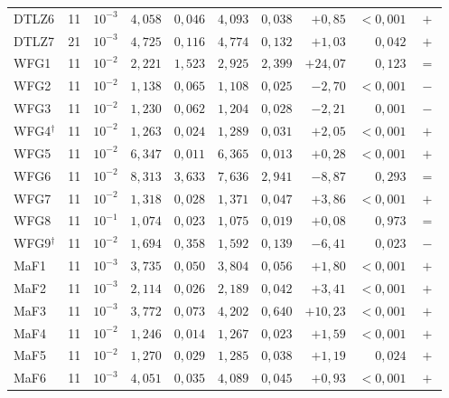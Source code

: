 \begin{table}[!htb]
\begin{tabular*}{\textwidth}{@{\extracolsep{\fill}}lrcrrrrrrc@{}}
        DTLZ6 & 11 & $10^{-3}$ & $4{,}058$ & $0{,}046$ & $4{,}093$ & $0{,}038$ & $+0{,}85$ & $<0{,}001$ & $+$ \\
        DTLZ7 & 21 & $10^{-3}$ & $4{,}725$ & $0{,}116$ & $4{,}774$ & $0{,}132$ & $+1{,}03$ & $0{,}042$ & $+$ \\
        \addlinespace
        WFG1 & 11 & $10^{-2}$ & $2{,}221$ & $1{,}523$ & $2{,}925$ & $2{,}399$ & $+24{,}07$ & $0{,}123$ & $=$ \\
        WFG2 & 11 & $10^{-2}$ & $1{,}138$ & $0{,}065$ & $1{,}108$ & $0{,}025$ & $-2{,}70$ & $<0{,}001$ & $-$ \\
        WFG3 & 11 & $10^{-2}$ & $1{,}230$ & $0{,}062$ & $1{,}204$ & $0{,}028$ & $-2{,}21$ & $0{,}001$ & $-$ \\
        WFG4$^{\dagger}$ & 11 & $10^{-2}$ & $1{,}263$ & $0{,}024$ & $1{,}289$ & $0{,}031$ & $+2{,}05$ & $<0{,}001$ & $+$ \\
        WFG5 & 11 & $10^{-2}$ & $6{,}347$ & $0{,}011$ & $6{,}365$ & $0{,}013$ & $+0{,}28$ & $<0{,}001$ & $+$ \\
        WFG6 & 11 & $10^{-2}$ & $8{,}313$ & $3{,}633$ & $7{,}636$ & $2{,}941$ & $-8{,}87$ & $0{,}293$ & $=$ \\
        WFG7 & 11 & $10^{-2}$ & $1{,}318$ & $0{,}028$ & $1{,}371$ & $0{,}047$ & $+3{,}86$ & $<0{,}001$ & $+$ \\
        WFG8 & 11 & $10^{-1}$ & $1{,}074$ & $0{,}023$ & $1{,}075$ & $0{,}019$ & $+0{,}08$ & $0{,}973$ & $=$ \\
        WFG9$^{\dagger}$ & 11 & $10^{-2}$ & $1{,}694$ & $0{,}358$ & $1{,}592$ & $0{,}139$ & $-6{,}41$ & $0{,}023$ & $-$ \\
        \addlinespace
        MaF1 & 11 & $10^{-3}$ & $3{,}735$ & $0{,}050$ & $3{,}804$ & $0{,}056$ & $+1{,}80$ & $<0{,}001$ & $+$ \\
        MaF2 & 11 & $10^{-3}$ & $2{,}114$ & $0{,}026$ & $2{,}189$ & $0{,}042$ & $+3{,}41$ & $<0{,}001$ & $+$ \\
        MaF3 & 11 & $10^{-3}$ & $3{,}772$ & $0{,}073$ & $4{,}202$ & $0{,}640$ & $+10{,}23$ & $<0{,}001$ & $+$ \\
        MaF4 & 11 & $10^{-2}$ & $1{,}246$ & $0{,}014$ & $1{,}267$ & $0{,}023$ & $+1{,}59$ & $<0{,}001$ & $+$ \\
        MaF5 & 11 & $10^{-2}$ & $1{,}270$ & $0{,}029$ & $1{,}285$ & $0{,}038$ & $+1{,}19$ & $0{,}024$ & $+$ \\
        MaF6 & 11 & $10^{-3}$ & $4{,}051$ & $0{,}035$ & $4{,}089$ & $0{,}045$ & $+0{,}93$ & $<0{,}001$ & $+$ \\

\end{tabular*}
\end{table}
